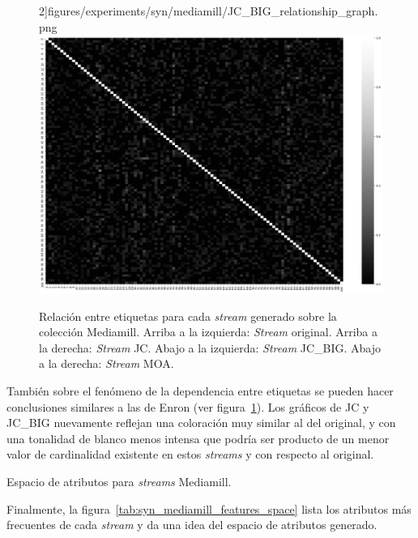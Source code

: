 \begin{figure}[htbp]
		2]{figures/experiments/syn/mediamill/JC_BIG_relationship_graph.png}
	\includegraphics[width=\linewidth /
		2]{figures/experiments/syn/mediamill/MOA_relationship_graph.png}
	\caption[Relación entre etiquetas para cada \textit{stream} generado sobre
		la colección Mediamill.]{Relación entre etiquetas para cada \textit{stream} generado sobre
		la colección Mediamill. Arriba a la izquierda: \textit{Stream} original.
		Arriba a la derecha: \textit{Stream} JC. Abajo a la izquierda:
		\textit{Stream} JC\_BIG. Abajo a la derecha: \textit{Stream} MOA.}
	\label{fig:syn_mediamill_label_relationship}
\end{figure}

También sobre el fenómeno de la dependencia entre etiquetas se pueden hacer
conclusiones similares a las de Enron (ver
figura~\ref{fig:syn_mediamill_label_relationship}). Los gráficos de JC y JC\_BIG
nuevamente reflejan una coloración muy similar al del original, y con una
tonalidad de blanco menos intensa que podría ser producto de un menor valor de
cardinalidad existente en estos \textit{streams} y con respecto al original.

\begin{table}[htbp]
	\centering
	\begin{adjustbox}{max width=\textwidth}
		
	\end{adjustbox}
	\caption{Espacio de atributos para \textit{streams} Mediamill.}
	\label{tab:syn_mediamill_features_space}
\end{table}

Finalmente, la figura~\ref{tab:syn_mediamill_features_space} lista los atributos más
frecuentes de cada \textit{stream} y da una idea del espacio de atributos
generado.

